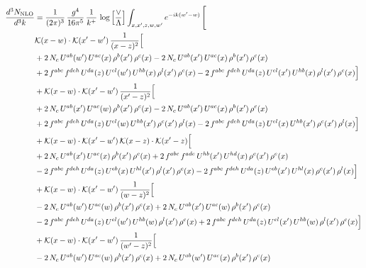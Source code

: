\documentclass[9pt]{article}
\numberwithin{equation}{section}
\begin{document}
\begin{align}
\frac{d^{3}N_{\mathrm{NLO}}}{d^{3}k} & = \frac{1}{(2\pi)^{3}}\,\frac{g^{4}}{16\pi^{5}}\,\frac{1}{k^{+}}\,\log\Big[\frac{\vee}{\Lambda}\Big]\int_{x,x',z,w,w'}e^{-ik(w'-w)}\,\Bigg[
\notag \\ & \mathcal{K}(x-w)\cdot\mathcal{K}(x'-w')\,\frac{1}{(x-z)^{2}}\Big[\notag\\
&+2\,N_{c}\,U^{ab}(w')\,U^{ac}(x)\,\rho^{b}(x')\,\rho^{c}(x) -2\,N_{c}\,U^{ab}(x')\,U^{ac}(x)\,\rho^{b}(x')\,\rho^{c}(x)\notag\\
& +2\,f^{abc}\,f^{deh}\,U^{da}(z)\,U^{el}(w')\,U^{hb}(x)\,\rho^{l}(x')\,\rho^{c}(x) -2\,f^{abc}\,f^{deh}\,U^{da}(z)\,U^{el}(x')\,U^{hb}(x)\,\rho^{l}(x')\,\rho^{c}(x)\Big]\notag\\
& +\mathcal{K}(x-w)\cdot\mathcal{K}(x'-w')\,\frac{1}{(x'-z)^{2}}\Big[\notag\\
& +2\,N_{c}\,U^{ab}(x')\,U^{ac}(w)\,\rho^{b}(x')\,\rho^{c}(x) -2\,N_{c}\,U^{ab}(x')\,U^{ac}(x)\,\rho^{b}(x')\,\rho^{c}(x)\notag\\
& +2\,f^{abc}\,f^{deh}\,U^{da}(z)\,U^{el}(w)\,U^{hb}(x')\,\rho^{c}(x')\,\rho^{l}(x) -2\,f^{abc}\,f^{deh}\,U^{da}(z)\,U^{el}(x)\,U^{hb}(x')\,\rho^{c}(x')\,\rho^{l}(x)\Big]\notag\\
& +\mathcal{K}(x-w)\cdot\mathcal{K}(x'-w')\,\mathcal{K}(x-z)\cdot\mathcal{K}(x'-z)\Big[\notag\\
& +2\,N_{c}\,U^{ab}(x')\,U^{ac}(x)\,\rho^{b}(x')\,\rho^{c}(x) +2\,f^{abc}\,f^{ade}\,U^{hb}(x')\,U^{hd}(x)\,\rho^{c}(x')\,\rho^{e}(x)\notag\\
& -2\,f^{abc}\,f^{deh}\,U^{da}(z)\,U^{eb}(x)\,U^{hl}(x')\,\rho^{l}(x')\,\rho^{c}(x) -2\,f^{abc}\,f^{deh}\,U^{da}(z)\,U^{eb}(x')\,U^{hl}(x)\,\rho^{c}(x')\,\rho^{l}(x)\Big]\notag\\
& +\mathcal{K}(x-w)\cdot\mathcal{K}(x'-w')\,\frac{1}{(w-z)^{2}}\Big[\notag\\
& -2\,N_{c}\,U^{ab}(w')\,U^{ac}(w)\,\rho^{b}(x')\,\rho^{c}(x) +2\,N_{c}\,U^{ab}(x')\,U^{ac}(w)\,\rho^{b}(x')\,\rho^{c}(x)\notag\\
& -2\,f^{abc}\,f^{deh}\,U^{da}(z)\,U^{el}(w')\,U^{hb}(w)\,\rho^{l}(x')\,\rho^{c}(x) +2\,f^{abc}\,f^{deh}\,U^{da}(z)\,U^{el}(x')\,U^{hb}(w)\,\rho^{l}(x')\,\rho^{c}(x)\Big]\notag\\
& +\mathcal{K}(x-w)\cdot\mathcal{K}(x'-w')\,\frac{1}{(w'-z)^{2}}\Big[\notag\\
& -2\,N_{c}\,U^{ab}(w')\,U^{ac}(w)\,\rho^{b}(x')\,\rho^{c}(x) +2\,N_{c}\,U^{ab}(w')\,U^{ac}(x)\,\rho^{b}(x')\,\rho^{c}(x)\notag\\

\end{align}
\end{document}
